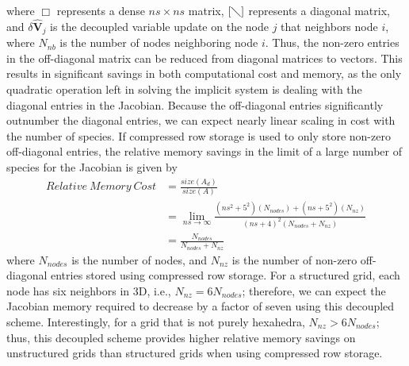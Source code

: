 where $\Box$ represents a dense $ns \times ns$ matrix, $[\diagdown]$ represents
a diagonal matrix, and $\delta \mathbf{\hat{V}}_j$  is the decoupled variable
update on the node $j$ that neighbors node $i$, where $N_{nb}$ is the number of
nodes neighboring node $i$.  Thus, the non-zero entries in the off-diagonal
matrix can be reduced from diagonal matrices to vectors.  This results in
significant savings in both computational cost and memory, as the only quadratic
operation left in solving the implicit system is dealing with the diagonal
entries in the Jacobian.  Because the off-diagonal entries significantly
outnumber the diagonal entries, we can expect nearly linear scaling in cost with
the number of species.  If compressed row storage\cite{George} is used to
only store non-zero off-diagonal entries, the relative memory savings in the
limit of a large number of species for the Jacobian is given by
\begin{equation}
  \label{mem_req_eq}
  \begin{split} 
    Relative\ Memory\ Cost &=
    \frac{size(A_d)}{size(A)} \\ &= \lim_{ns\to\infty}
    \frac{(ns^2+5^2)(N_{nodes})+(ns+5^2)(N_{nz})}{(ns+4)^2(N_{nodes}+N_{nz})} \\
    &= \frac{N_{nodes}}{N_{nodes} + N_{nz}}
  \end{split}
\end{equation}
where $N_{nodes}$ is the number of nodes, and $N_{nz}$ is the number of non-zero
off-diagonal entries stored using compressed row storage. For a structured grid,
each node has six neighbors in 3D, i.e., $N_{nz} = 6N_{nodes}$; therefore, we can
expect the Jacobian memory required to decrease by a factor of seven using this
decoupled scheme. Interestingly, for a grid that is not purely hexahedra,
$N_{nz} > 6N_{nodes}$; thus, this decoupled scheme provides higher relative
memory savings on unstructured grids than structured grids when using compressed
row storage.


